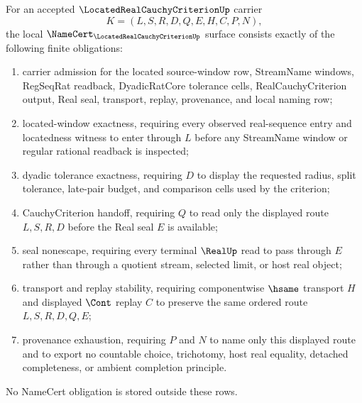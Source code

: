 \begin{theorem}
\label{thm:located-real-cauchy-criterion-namecert-obligations}
For an accepted $\LocatedRealCauchyCriterionUp$ carrier
$$
K=(L,S,R,D,Q,E,H,C,P,N),
$$
the local $\NameCert_{\LocatedRealCauchyCriterionUp}$ surface consists exactly of the following finite obligations:
\begin{enumerate}
\item carrier admission for the located source-window row, StreamName windows, RegSeqRat readback, DyadicRatCore tolerance cells, RealCauchyCriterion output, Real seal, transport, replay, provenance, and local naming row;
\item located-window exactness, requiring every observed real-sequence entry and locatedness witness to enter through $L$ before any StreamName window or regular rational readback is inspected;
\item dyadic tolerance exactness, requiring $D$ to display the requested radius, split tolerance, late-pair budget, and comparison cells used by the criterion;
\item CauchyCriterion handoff, requiring $Q$ to read only the displayed route $L,S,R,D$ before the Real seal $E$ is available;
\item seal nonescape, requiring every terminal $\RealUp$ read to pass through $E$ rather than through a quotient stream, selected limit, or host real object;
\item transport and replay stability, requiring componentwise $\hsame$ transport $H$ and displayed $\Cont$ replay $C$ to preserve the same ordered route $L,S,R,D,Q,E$;
\item provenance exhaustion, requiring $P$ and $N$ to name only this displayed route and to export no countable choice, trichotomy, host real equality, detached completeness, or ambient completion principle.
\end{enumerate}
No NameCert obligation is stored outside these rows.
\end{theorem}
